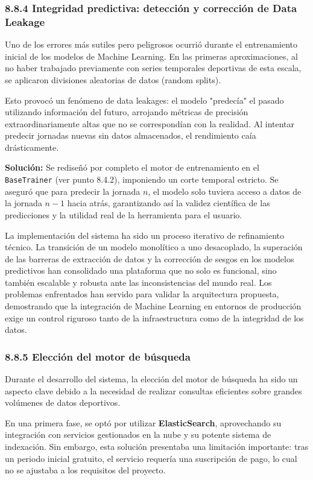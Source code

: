 \subsubsection{8.8.4 Integridad predictiva: detección y corrección de Data Leakage}
Uno de los errores más sutiles pero peligrosos ocurrió durante el entrenamiento inicial de los modelos de Machine Learning. En las primeras aproximaciones, al no haber trabajado previamente con series temporales deportivas de esta escala, 
se aplicaron divisiones aleatorias de datos (random splits).

Esto provocó un fenómeno de data leakages: el modelo "predecía" el pasado utilizando información del futuro, arrojando métricas de precisión extraordinariamente altas que no se correspondían con la realidad. Al intentar
 predecir jornadas nuevas sin datos almacenados, el rendimiento caía drásticamente.

\textbf{Solución:} Se rediseñó por completo el motor de entrenamiento en el \texttt{BaseTrainer} (ver punto 8.4.2), imponiendo un corte temporal estricto. Se aseguró que para predecir la jornada $n$, el modelo solo tuviera acceso a datos
 de la jornada $n-1$ hacia atrás, garantizando así la validez científica de las predicciones y la utilidad real de la herramienta para el usuario.

La implementación del sistema ha sido un proceso iterativo de refinamiento técnico. La transición de un modelo monolítico a uno desacoplado, la superación de las barreras de extracción de datos y la corrección de sesgos en los modelos
 predictivos han consolidado una plataforma que no solo es funcional, sino también escalable y robusta ante las inconsistencias del mundo real. Los problemas enfrentados han servido para validar la arquitectura propuesta, demostrando que la integración de Machine Learning en entornos de producción exige un control riguroso tanto de la infraestructura como de la integridad de los datos.

\subsubsection{8.8.5 Elección del motor de búsqueda}

Durante el desarrollo del sistema, la elección del motor de búsqueda ha sido un aspecto clave debido a la necesidad de realizar consultas eficientes sobre grandes volúmenes de datos deportivos.

En una primera fase, se optó por utilizar \textbf{ElasticSearch}, aprovechando su integración con servicios gestionados en la nube y su potente sistema de indexación. Sin embargo, esta solución presentaba una limitación importante: tras un periodo inicial gratuito, el servicio requería una suscripción de pago, lo cual no se ajustaba a los requisitos del proyecto.

